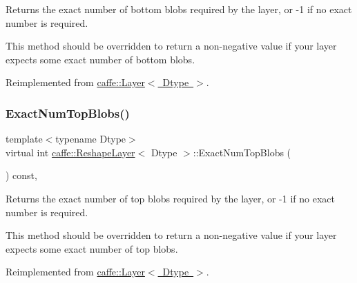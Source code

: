 Returns the exact number of bottom blobs required by the layer, or -\/1 if no exact number is required. 

This method should be overridden to return a non-\/negative value if your layer expects some exact number of bottom blobs. 

Reimplemented from \mbox{\hyperlink{classcaffe_1_1_layer_a8e5ee0494d85f5f55fc4396537cbc60f}{caffe\+::\+Layer$<$ Dtype $>$}}.

\mbox{\label{classcaffe_1_1_reshape_layer_a3318c2404c6072ba07178b48d39ef0f5}} 
\subsubsection{\texorpdfstring{Exact\+Num\+Top\+Blobs()}{ExactNumTopBlobs()}\hspace{0.1cm}{\footnotesize\ttfamily [1/2]}}
{\footnotesize\ttfamily template$<$typename Dtype$>$ \\
virtual int \mbox{\hyperlink{classcaffe_1_1_reshape_layer}{caffe\+::\+Reshape\+Layer}}$<$ Dtype $>$\+::Exact\+Num\+Top\+Blobs (\begin{DoxyParamCaption}{ }\end{DoxyParamCaption}) const\hspace{0.3cm}{\ttfamily [inline]}, {\ttfamily [virtual]}}



Returns the exact number of top blobs required by the layer, or -\/1 if no exact number is required. 

This method should be overridden to return a non-\/negative value if your layer expects some exact number of top blobs. 

Reimplemented from \mbox{\hyperlink{classcaffe_1_1_layer_a64e2ca72c719e4b2f1f9216ccfb0d37f}{caffe\+::\+Layer$<$ Dtype $>$}}.

\mbox{\label{classcaffe_1_1_reshape_layer_a3318c2404c6072ba07178b48d39ef0f5}} 
